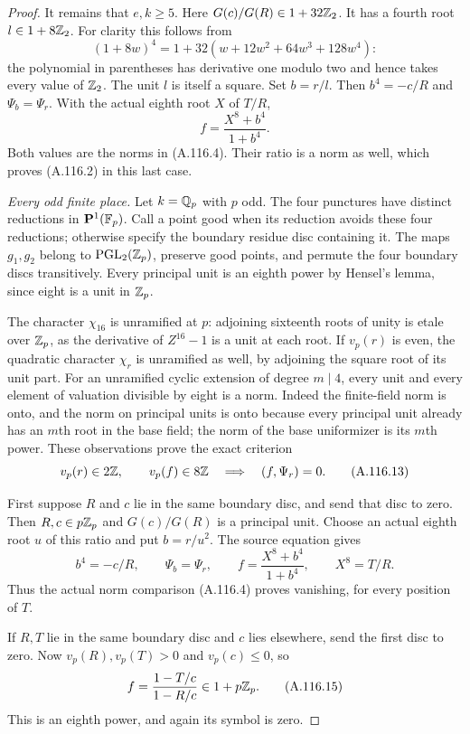\begin{proof}
It remains that $e,k\ge5$.
Here $G(c)/G(R)\in1+32\mathbb Z_2$.
It has a fourth root $l\in1+8\mathbb Z_2$.
For clarity this follows from
\[
 (1+8w)^4=1+32(w+12w^2+64w^3+128w^4):
\tag{A.116.11}
\]
the polynomial in parentheses has derivative one
modulo two and hence takes every value of $\mathbb Z_2$.
The unit $l$ is itself a square.
Set $b=r/l$.
Then $b^4=-c/R$ and $\Psi_b=\Psi_r$.
With the actual eighth root $X$ of $T/R$,
\[
                         f=\frac{X^8+b^4}{1+b^4}.
\tag{A.116.12}
\]
Both values are the norms in (A.116.4).
Their ratio is a norm as well, which proves
(A.116.2) in this last case.

\emph{Every odd finite place.}
Let $k=\mathbb Q_p$ with $p$ odd.
The four punctures have distinct reductions in
$\mathbf P^1(\mathbb F_p)$.
Call a point good when its reduction avoids these
four reductions; otherwise specify the boundary
residue disc containing it.
The maps $g_1,g_2$ belong to $\operatorname{PGL}_2(\mathbb Z_p)$,
preserve good points, and permute the four boundary
discs transitively.
Every principal unit is an eighth power by Hensel's
lemma, since eight is a unit in $\mathbb Z_p$.

The character $\chi_{16}$ is unramified at $p$:
adjoining sixteenth roots of unity is etale over
$\mathbb Z_p$, as the derivative of $Z^{16}-1$ is a unit
at each root.
If $v_p(r)$ is even, the quadratic character
$\chi_r$ is unramified as well, by adjoining the
square root of its unit part.
For an unramified cyclic extension of degree
$m\mid4$, every unit and every element of valuation
divisible by eight is a norm.
Indeed the finite-field norm is onto, and the norm
on principal units is onto because every principal
unit already has an $m$th root in the base field;
the norm of the base uniformizer is its $m$th power.
These observations prove the exact criterion
\[
 v_p(r)\in2\mathbb Z,\qquad v_p(f)\in8\mathbb Z
           \quad\Longrightarrow\quad (f,\Psi_r)=0.
\tag{A.116.13}
\]

First suppose $R$ and $c$ lie in the same boundary
disc, and send that disc to zero.
Then $R,c\in p\mathbb Z_p$ and $G(c)/G(R)$ is a principal
unit.
Choose an actual eighth root $u$ of this ratio and
put $b=r/u^2$.
The source equation gives
\[
 b^4=-c/R,\qquad \Psi_b=\Psi_r,\qquad
 f=\frac{X^8+b^4}{1+b^4},\qquad X^8=T/R.
\tag{A.116.14}
\]
Thus the actual norm comparison (A.116.4) proves
vanishing, for every position of $T$.

If $R,T$ lie in the same boundary disc and $c$ lies
elsewhere, send the first disc to zero.
Now $v_p(R),v_p(T)>0$ and $v_p(c)\le0$, so
\[
                   f=\frac{1-T/c}{1-R/c}\in1+p\mathbb Z_p.
\tag{A.116.15}
\]
This is an eighth power, and again its symbol is zero.


\end{proof}
